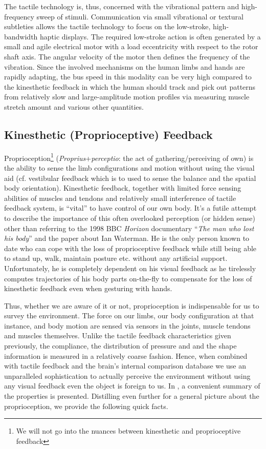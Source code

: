 The tactile technology is, thus, concerned with the vibrational pattern and high-frequency sweep of stimuli. Communication via small vibrational or textural subtleties allows the tactile technology to focus on the low-stroke, high-bandwidth haptic displays. The required low-stroke action is often generated by a small and agile electrical motor with a load eccentricity with respect to the rotor shaft axis. The angular velocity of the motor then defines the frequency of the vibration. Since the involved mechanisms on the human limbs and hands are rapidly adapting, the bus speed in this modality can be very high compared to the kinesthetic feedback in which the human should track and pick out patterns from relatively slow and large-amplitude motion profiles via measuring muscle stretch amount and various other quantities. 


\subsection{Kinesthetic (Proprioceptive) Feedback}
Proprioception\footnote{We will not go into the nuances between kinesthetic and proprioceptive feedback} (\emph{Proprius}+\emph{perceptio}: the act of gathering/perceiving of own) is the ability to sense the limb configurations and motion without using the visual aid (cf. vestibular feedback which is to used to sense the balance and the spatial body orientation). Kinesthetic feedback, together with limited force sensing abilities of muscles and tendons and relatively small interference of tactile feedback system, is \enquote{vital} to have control of our own body. It's a futile attempt to describe the importance of this often overlooked perception (or hidden sense) other than referring to the 1998 BBC \emph{Horizon} documentary \enquote{\emph{The man who lost his body}} and the paper \cite{waterman} about Ian Waterman. He is the only person known to date who can cope with the loss of proprioceptive feedback while still being able to stand up, walk, maintain posture etc. without any artificial support. Unfortunately, he is completely dependent on his visual feedback as he tirelessly computes trajectories of his body parts on-the-fly to compensate for the loss of kinesthetic feedback even when gesturing with hands. 

Thus, whether we are aware of it or not, proprioception is indispensable for us to survey the environment. The force on our limbs, our body configuration at that instance, and body motion are sensed via sensors in the joints, muscle tendons and muscles themselves. Unlike the tactile feedback characteristics given previously, the compliance, the distribution of pressure and and the shape information is measured in a relatively coarse fashion. Hence, when combined with tactile feedback and the brain's internal comparison database we use an unparalleled sophistication to actually perceive the environment without using any visual feedback even the object is foreign to us. In \cite{biggssrinivasan}, a convenient summary of the properties is presented. Distilling even further for a general picture about the proprioception, we provide the following quick facts. 

